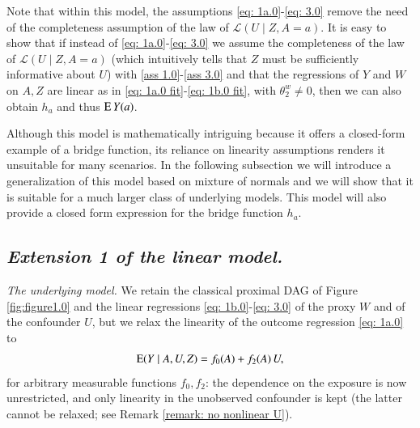 Note that within this model, the assumptions \eqref{eq: 1a.0}-\eqref{eq: 3.0} remove the need of the completeness assumption of the law of $\mathcal{L}(U \mid Z,A=a)$. It is easy to show that if instead of \eqref{eq: 1a.0}-\eqref{eq: 3.0} we assume the completeness of the law of $\mathcal{L}(U \mid Z,A=a)$ (which intuitively tells that $Z$ must be sufficiently informative about $U$) with \ref{ass 1.0}-\ref{ass 3.0} and that the regressions of $Y$ and $W$ on $A,Z$ are linear as in \eqref{eq: 1a.0 fit}-\eqref{eq: 1b.0 fit}, with $\theta_{2}^{w} \neq 0$, then we can also obtain $h_a$ and thus $\mathrm{E} \, Y(a)$. 

Although this model is mathematically intriguing because it offers a closed-form example of a bridge function, its reliance on linearity assumptions renders it unsuitable for many scenarios. In the following subsection we will introduce a generalization of this model based on mixture of normals and we will show that it is suitable for a much larger class of underlying models. This model will also provide a closed form expression for the bridge function $h_a$. 

\subsection*{\textit{Extension 1 of the linear model.}}

\emph{The underlying model.} We retain the classical proximal DAG of Figure \ref{fig:figure1.0} and the linear regressions \eqref{eq: 1b.0}-\eqref{eq: 3.0} of the proxy $W$ and of the confounder $U$, but we relax the linearity of the outcome regression \eqref{eq: 1a.0} to
\[
\mathrm{E}(Y \mid A,U,Z) = f_0(A) + f_2(A)\, U,
\]
for arbitrary measurable functions $f_0, f_2$: the dependence on the exposure is now unrestricted, and only linearity in the unobserved confounder is kept (the latter cannot be relaxed; see Remark \ref{remark: no nonlinear U}).

